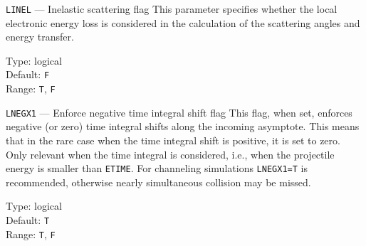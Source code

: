 \begin{keydescription}{\texttt{LINEL} --- Inelastic scattering flag}
%
  This parameter specifies whether the local electronic energy loss is
  considered in the calculation of the scattering angles and energy
  transfer.
  \begin{keytab}
    Type:    \> logical \\
    Default: \> \texttt{F} \\
    Range:   \> \texttt{T}, \texttt{F}
  \end{keytab}
\end{keydescription}

\begin{keydescription}{\texttt{LNEGX1} --- Enforce negative time integral shift flag}
%
  This flag, when set, enforces negative (or zero) time integral shifts along 
  the incoming asymptote. This means that in the rare case when the time 
  integral shift is positive, it is set to zero. Only relevant when the time 
  integral is considered, i.e., when the projectile energy is smaller than 
  \texttt{ETIME}. For channeling simulations \texttt{LNEGX1=T} is recommended, 
  otherwise nearly simultaneous collision may be missed.
  \begin{keytab}
    Type:    \> logical \\
    Default: \> \texttt{T} \\
    Range:   \> \texttt{T}, \texttt{F}
  \end{keytab}
\end{keydescription}


